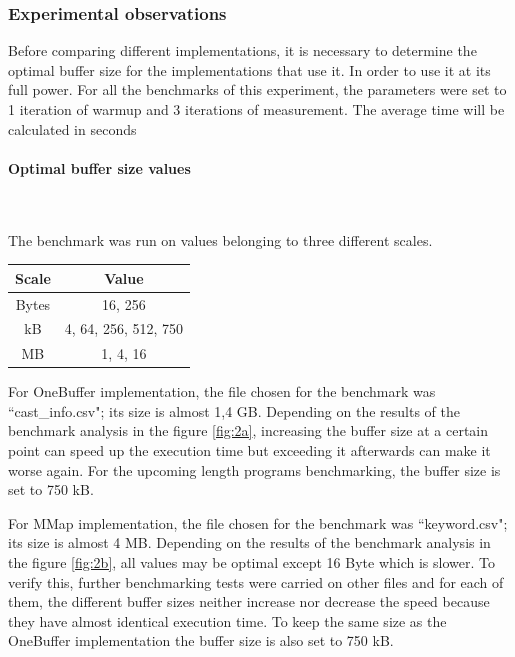 \documentclass[12pt]{article}
\begin{document}
\subsubsection{Experimental observations} \label{res1.1}
Before comparing different implementations, it is necessary to determine the optimal buffer size for the implementations that use it. In order to use it at its full power. For all the benchmarks of this experiment, the parameters were set to 1 iteration of warmup and 3 iterations of measurement. The average time will be calculated in seconds
\paragraph{Optimal buffer size values}\mbox{}\\
\par The benchmark was run on values belonging to three different scales.
\begin{center}
\begin{tabular}{|c|c|}
\hline
\textbf{Scale} & \textbf{Value}\\
\hline\hline
Bytes & 16, 256 \\
\hline
kB & 4, 64, 256, 512, 750 \\
\hline
MB & 1, 4, 16 \\
\hline
\end{tabular}
\end{center}

For OneBuffer implementation, the file chosen for the benchmark was ``cast\_info.csv"; its size is almost 1,4 GB. Depending on the results of the benchmark analysis in the figure \ref{fig:2a}, increasing the buffer size at a certain point can speed up the execution time but exceeding it afterwards can make it worse again. For the upcoming length programs benchmarking, the buffer size is set to 750 kB.

For MMap implementation, the file chosen for the benchmark was ``keyword.csv"; its size is almost 4 MB. Depending on the results of the benchmark analysis in the figure \ref{fig:2b}, all values may be optimal except 16 Byte which is slower. To verify this, further benchmarking tests were carried on other files and for each of them, the different buffer sizes neither increase nor decrease the speed because they have almost identical execution time. To keep the same size as the OneBuffer implementation the buffer size is also set to 750 kB.
\end{document}
